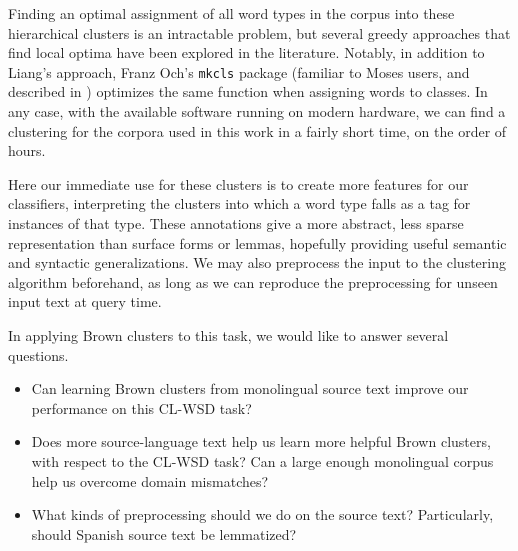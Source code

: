Finding an optimal assignment of all word types in the corpus into these
hierarchical clusters is an intractable problem, but several greedy approaches
that find local optima have been explored in the literature.  Notably, in
addition to Liang's approach, Franz Och's \texttt{mkcls} package (familiar to
Moses users, and described in \cite{och1999efficient}) optimizes the same
function when assigning words to classes. In any case, with the available
software running on modern hardware, we can find a clustering for the corpora
used in this work in a fairly short time, on the order of hours.

Here our immediate use for these clusters is to create more features for our
classifiers, interpreting the clusters into which a word type falls as a tag
for instances of that type. These annotations give a more abstract, less sparse
representation than surface forms or lemmas, hopefully providing useful
semantic and syntactic generalizations. We may also preprocess the input to
the clustering algorithm beforehand, as long as we can reproduce the
preprocessing for unseen input text at query time.

In applying Brown clusters to this task, we would like to answer several
questions.

\begin{itemize}
  \item Can learning Brown clusters from monolingual source text improve our
  performance on this CL-WSD task?
  \item Does more source-language text help us learn more helpful Brown
  clusters, with respect to the CL-WSD task? Can a large enough monolingual
  corpus help us overcome domain mismatches?
  \item What kinds of preprocessing should we do on the source text?
  Particularly, should Spanish source text be lemmatized?
\end{itemize}

